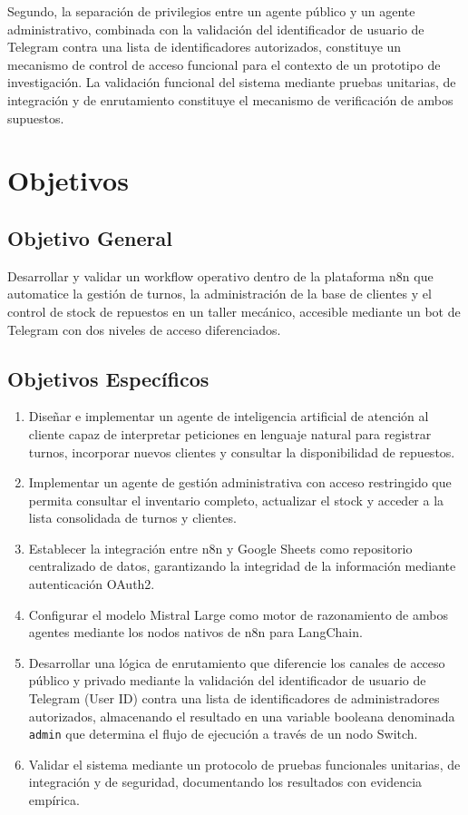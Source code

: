 \documentclass[12pt,a4paper]{report}
\begin{document}
Segundo, la separación de privilegios entre un agente público y un agente administrativo, combinada con la validación del identificador de usuario de Telegram contra una lista de identificadores autorizados, constituye un mecanismo de control de acceso funcional para el contexto de un prototipo de investigación. La validación funcional del sistema mediante pruebas unitarias, de integración y de enrutamiento constituye el mecanismo de verificación de ambos supuestos.

\section{Objetivos}

\subsection{Objetivo General}

Desarrollar y validar un workflow operativo dentro de la plataforma n8n que automatice la gestión de turnos, la administración de la base de clientes y el control de stock de repuestos en un taller mecánico, accesible mediante un bot de Telegram con dos niveles de acceso diferenciados.

\subsection{Objetivos Específicos}

\begin{enumerate}
  \item Diseñar e implementar un agente de inteligencia artificial de atención al cliente capaz de interpretar peticiones en lenguaje natural para registrar turnos, incorporar nuevos clientes y consultar la disponibilidad de repuestos.
  \item Implementar un agente de gestión administrativa con acceso restringido que permita consultar el inventario completo, actualizar el stock y acceder a la lista consolidada de turnos y clientes.
  \item Establecer la integración entre n8n y Google Sheets como repositorio centralizado de datos, garantizando la integridad de la información mediante autenticación OAuth2.
  \item Configurar el modelo Mistral Large como motor de razonamiento de ambos agentes mediante los nodos nativos de n8n para LangChain.
  \item Desarrollar una lógica de enrutamiento que diferencie los canales de acceso público y privado mediante la validación del identificador de usuario de Telegram (User ID) contra una lista de identificadores de administradores autorizados, almacenando el resultado en una variable booleana denominada \texttt{admin} que determina el flujo de ejecución a través de un nodo Switch.
  \item Validar el sistema mediante un protocolo de pruebas funcionales unitarias, de integración y de seguridad, documentando los resultados con evidencia empírica.
\end{enumerate}
\end{document}
